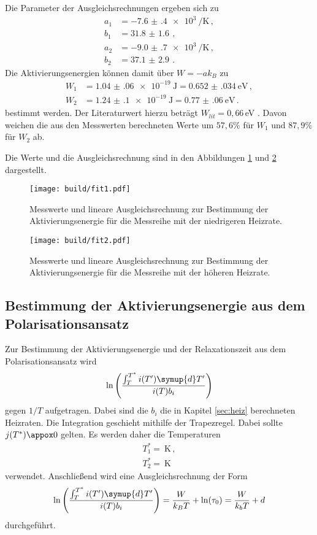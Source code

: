 Die Parameter
der Ausgleichsrechnungen ergeben sich zu
\begin{align*}
  a_1&=\SI{-7.6(4)e+3}{\per\kelvin} \,, \\
  b_1&=\SI{31.8(16)}{}  \,, \\
  a_2&=\SI{-9.0(7)e+3}{\per\kelvin} \,, \\
  b_2&=\SI{37.1(29)}{}  \,.
\end{align*}
Die Aktivierungsenergien können damit über $W=-ak_B$ zu
\begin{align*}
 W_1&=\SI{1.04(06)e-19}{\joule}= \SI{0.652(034)}{\eV}  \,, \\
 W_2&=\SI{1.24(10)e-19}{\joule}=\SI{0.77(06)}{\eV} \,.
\end{align*}
bestimmt werden. Der Literaturwert hierzu beträgt $W_{lit}=0{,}66\,$eV \cite{lit}. Davon weichen
die aus den Messwerten berechneten Werte um $57{,}6\%$ für $W_1$ und $87,9\%$ für
$W_2$ ab.

Die Werte und die Ausgleichsrechnung sind in den Abbildungen \ref{fig:fit1} und
\ref{fig:fit2} dargestellt.

\begin{figure}
  \centering
  \texttt{[image: build/fit1.pdf]}
  \caption{Messwerte und lineare Ausgleichsrechnung zur Bestimmung der Aktivierungsenergie für
  die Messreihe mit der niedrigeren Heizrate.}
  \label{fig:fit1}
\end{figure}
\begin{figure}
  \centering
  \texttt{[image: build/fit2.pdf]}
  \caption{Messwerte und lineare Ausgleichsrechnung zur Bestimmung der Aktivierungsenergie für
  die Messreihe mit der höheren Heizrate.}
  \label{fig:fit2}
\end{figure}

\newpage
\subsection{Bestimmung der Aktivierungsenergie aus dem Polarisationsansatz}

Zur Bestimmung der Aktivierungsenergie und der Relaxationszeit aus dem Polarisationsansatz wird
\begin{equation*}
	\ln\left(\frac{\int_T^{T^*}i(T') \symup{d}T'}{i(T) b_i}\right)
\end{equation*}
gegen $1/T$ aufgetragen. Dabei sind die $b_i$ die in Kapitel \ref{sec:heiz}
berechneten Heizraten. Die Integration geschieht mithilfe der Trapezregel. Dabei sollte $j(T^*)\appox 0$ gelten. Es werden daher die Temperaturen
\begin{align*}
	T_1^*=\SI{}{\kelvin} \,, \\
	T_2^*=\SI{}{\kelvin}
\end{align*}
verwendet. Anschließend wird eine Ausgleichsrechnung der Form
\begin{equation*}
	\ln\left(\frac{\int_T^{T^*}i(T') \symup{d}T'}{i(T) b_i}\right) =\frac{W}{k_B T}+\ln(\tau_0)=\frac{W}{k_b T}+d
\end{equation*}
durchgeführt.

